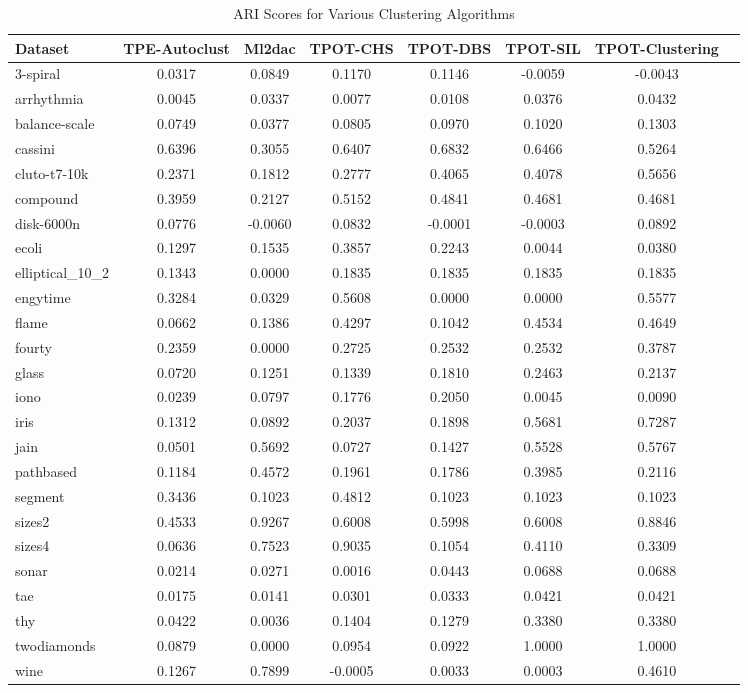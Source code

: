 \begin{table}
\caption{ARI Scores for Various Clustering Algorithms}
\label{tab:ari_scores}
\begin{tabular}{lccccccc}
\toprule
Dataset & TPE-Autoclust & Ml2dac & TPOT-CHS & TPOT-DBS & TPOT-SIL & TPOT-Clustering \\
\midrule
3-spiral & 0.0317 & 0.0849 & 0.1170 & 0.1146 & -0.0059 & -0.0043 \\
arrhythmia & 0.0045 & 0.0337 & 0.0077 & 0.0108 & 0.0376 & 0.0432 \\
balance-scale & 0.0749 & 0.0377 & 0.0805 & 0.0970 & 0.1020 & 0.1303 \\
cassini & 0.6396 & 0.3055 & 0.6407 & 0.6832 & 0.6466 & 0.5264 \\
cluto-t7-10k & 0.2371 & 0.1812 & 0.2777 & 0.4065 & 0.4078 & 0.5656 \\
compound & 0.3959 & 0.2127 & 0.5152 & 0.4841 & 0.4681 & 0.4681 \\
disk-6000n & 0.0776 & -0.0060 & 0.0832 & -0.0001 & -0.0003 & 0.0892 \\
ecoli & 0.1297 & 0.1535 & 0.3857 & 0.2243 & 0.0044 & 0.0380 \\
elliptical_10_2 & 0.1343 & 0.0000 & 0.1835 & 0.1835 & 0.1835 & 0.1835 \\
engytime & 0.3284 & 0.0329 & 0.5608 & 0.0000 & 0.0000 & 0.5577 \\
flame & 0.0662 & 0.1386 & 0.4297 & 0.1042 & 0.4534 & 0.4649 \\
fourty & 0.2359 & 0.0000 & 0.2725 & 0.2532 & 0.2532 & 0.3787 \\
glass & 0.0720 & 0.1251 & 0.1339 & 0.1810 & 0.2463 & 0.2137 \\
iono & 0.0239 & 0.0797 & 0.1776 & 0.2050 & 0.0045 & 0.0090 \\
iris & 0.1312 & 0.0892 & 0.2037 & 0.1898 & 0.5681 & 0.7287 \\
jain & 0.0501 & 0.5692 & 0.0727 & 0.1427 & 0.5528 & 0.5767 \\
pathbased & 0.1184 & 0.4572 & 0.1961 & 0.1786 & 0.3985 & 0.2116 \\
segment & 0.3436 & 0.1023 & 0.4812 & 0.1023 & 0.1023 & 0.1023 \\
sizes2 & 0.4533 & 0.9267 & 0.6008 & 0.5998 & 0.6008 & 0.8846 \\
sizes4 & 0.0636 & 0.7523 & 0.9035 & 0.1054 & 0.4110 & 0.3309 \\
sonar & 0.0214 & 0.0271 & 0.0016 & 0.0443 & 0.0688 & 0.0688 \\
tae & 0.0175 & 0.0141 & 0.0301 & 0.0333 & 0.0421 & 0.0421 \\
thy & 0.0422 & 0.0036 & 0.1404 & 0.1279 & 0.3380 & 0.3380 \\
twodiamonds & 0.0879 & 0.0000 & 0.0954 & 0.0922 & 1.0000 & 1.0000 \\
wine & 0.1267 & 0.7899 & -0.0005 & 0.0033 & 0.0003 & 0.4610 \\
\bottomrule
\end{tabular}
\end{table}
